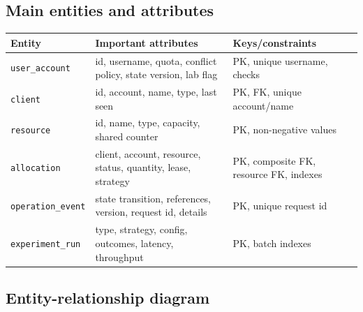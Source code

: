 \documentclass[12pt,a4paper]{article}
\begin{document}
\subsection{Main entities and attributes}
\begin{longtable}{p{}p{}p{}}
\toprule
\textbf{Entity} & \textbf{Important attributes} & \textbf{Keys/constraints}\\
\midrule
\texttt{user\_account} & id, username, quota, conflict policy, state version, lab flag & PK, unique username, checks\\
\texttt{client} & id, account, name, type, last seen & PK, FK, unique account/name\\
\texttt{resource} & id, name, type, capacity, shared counter & PK, non-negative values\\
\texttt{allocation} & client, account, resource, status, quantity, lease, strategy & PK, composite FK, resource FK, indexes\\
\texttt{operation\_event} & state transition, references, version, request id, details & PK, unique request id\\
\texttt{experiment\_run} & type, strategy, config, outcomes, latency, throughput & PK, batch indexes\\
\bottomrule
\end{longtable}

\subsection{Entity-relationship diagram}

\begin{center}
\end{center}
\end{document}
